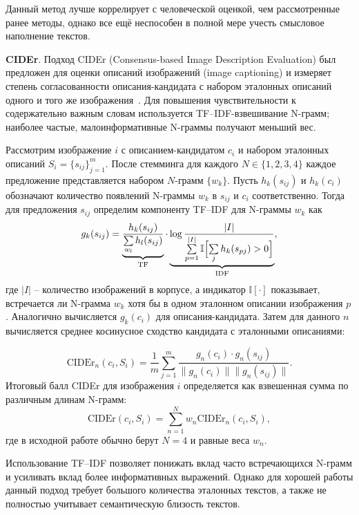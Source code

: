     Данный метод лучше коррелирует с человеческой оценкой, чем рассмотренные ранее методы, однако все ещё неспособен в полной мере учесть смысловое наполнение текстов.


\textbf{CIDEr}.
Подход CIDEr (Consensus-based Image Description Evaluation) был предложен для оценки описаний изображений (image captioning) и измеряет степень согласованности описания-кандидата с набором эталонных описаний одного и того же изображения~\cite{vedantam2015cider}. Для повышения чувствительности к содержательно важным словам используется TF–IDF-взвешивание N-грамм; наиболее частые, малоинформативные N-граммы получают меньший вес. 

Рассмотрим изображение $i$ с описанием-кандидатом $c_i$ и набором эталонных описаний $S_i = \{s_{ij}\}_{j=1}^{m}$. После стемминга для каждого $N \in \{1,2,3,4\}$ каждое предложение представляется набором $N$-грамм $\{w_k\}$. Пусть $h_k(s_{ij})$ и $h_k(c_i)$ обозначают количество появлений N-граммы $w_k$ в $s_{ij}$ и $c_i$ соответственно. Тогда для предложения $s_{ij}$ определим компоненту TF–IDF для N-граммы $w_k$ как
\[
g_k(s_{ij}) = \underbrace{\frac{h_k(s_{ij})}{\sum\limits_{w_l} h_l(s_{ij})}}_{\text{TF}} \cdot
\underbrace{\log \frac{|I|}{\sum\limits_{p=1}^{|I|} \mathbb{I}\Bigl[\sum\limits_{j} h_k(s_{pj}) > 0\Bigr]}}_{\text{IDF}},
\]
где $|I|$ -- количество изображений в корпусе, а индикатор $\mathbb{I}[\cdot]$ показывает, встречается ли N-грамма $w_k$ хотя бы в одном эталонном описании изображения $p$. Аналогично вычисляется $g_k(c_i)$ для описания-кандидата. Затем для данного $n$ вычисляется среднее косинусное сходство кандидата с эталонными описаниями:

\[
\mathrm{CIDEr}_n(c_i, S_i) = \frac{1}{m} \sum_{j=1}^m
\frac{ g_n(c_i) \cdot g_n(s_{ij}) }{ \lVert g_n(c_i)\rVert \lVert g_n(s_{ij})\rVert }.
\]
Итоговый балл CIDEr для изображения $i$ определяется как взвешенная сумма по различным длинам N-грамм:
\[
\mathrm{CIDEr}(c_i, S_i) = \sum_{n=1}^{N} w_n \mathrm{CIDEr}_n(c_i, S_i),
\]
где в исходной работе обычно берут $N = 4$ и равные веса $w_n$.

Использование TF–IDF позволяет понижать вклад часто встречающихся N-грамм и усиливать вклад более информативных выражений. Однако для хорошей работы данный подход требует большого количества эталонных текстов, а также не полностью учитывает семантическую близость текстов.

